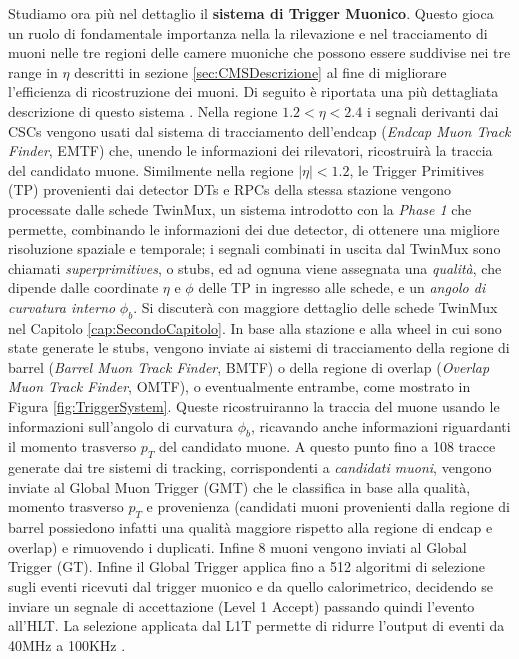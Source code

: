 Studiamo ora più nel dettaglio il \textbf{sistema di Trigger Muonico}. Questo gioca un ruolo di fondamentale importanza nella la rilevazione e nel tracciamento di muoni nelle tre regioni delle camere muoniche che possono essere suddivise nei tre range in $\eta$ descritti in sezione \ref{sec:CMSDescrizione} al fine di migliorare l'efficienza di ricostruzione dei muoni. Di seguito è riportata una più dettagliata descrizione di questo sistema \cite{sirunyan2020performance}.\newline
Nella regione $1.2 < \eta < 2.4$ i segnali derivanti dai CSCs vengono usati dal sistema di tracciamento dell'endcap (\textit{Endcap Muon Track Finder}, EMTF) che, unendo le informazioni dei rilevatori, ricostruirà la traccia del candidato muone.\newline
Similmente nella regione $|\eta| < 1.2$, le Trigger Primitives (TP) provenienti dai detector DTs e RPCs della stessa stazione vengono processate dalle schede TwinMux, un sistema introdotto con la \textit{Phase 1} che permette, combinando le informazioni dei due detector, di ottenere una migliore risoluzione spaziale e temporale; i segnali combinati in uscita dal TwinMux sono chiamati \textit{superprimitives}, o stubs, ed ad ognuna viene assegnata una \textit{qualità}, che dipende dalle coordinate $\eta$ e $\phi$ delle TP in ingresso alle schede, e un \textit{angolo di curvatura interno} $\phi_b$. 
Si discuterà con maggiore dettaglio delle schede TwinMux nel Capitolo \ref{cap:SecondoCapitolo}. In base alla stazione e alla wheel in cui sono state generate le stubs, vengono inviate ai sistemi di tracciamento della regione di barrel (\textit{Barrel Muon Track Finder}, BMTF) o della regione di overlap (\textit{Overlap Muon Track Finder}, OMTF), o eventualmente entrambe, come mostrato in Figura \ref{fig:TriggerSystem}. Queste  ricostruiranno la traccia del muone usando le informazioni sull'angolo di curvatura $\phi_b$, ricavando anche informazioni riguardanti il momento trasverso $p_T$ del candidato muone. \newline
A questo punto fino a 108 tracce generate dai tre sistemi di tracking, corrispondenti a \textit{candidati muoni}, vengono inviate al Global Muon Trigger (GMT) che le classifica in base alla qualità, momento trasverso $p_T$ e provenienza (candidati muoni provenienti dalla regione di barrel possiedono infatti una qualità maggiore rispetto alla regione di endcap e overlap) e rimuovendo i duplicati. Infine 8 muoni vengono inviati al Global Trigger (GT). \newline
Infine il Global Trigger applica fino a 512 algoritmi di selezione sugli eventi ricevuti dal trigger muonico e da quello calorimetrico, decidendo se inviare un segnale di accettazione (Level 1 Accept) passando quindi l'evento all'HLT. La selezione applicata dal L1T permette di ridurre l'output di eventi da 40MHz a 100KHz \cite{CERNsummerSchool}.\newline
